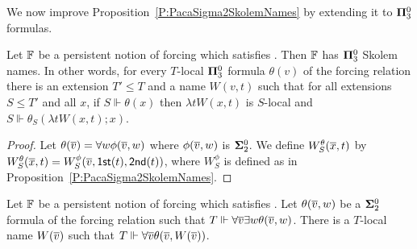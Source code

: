 We now improve Proposition~\ref{P:PacaSigma2SkolemNames}
by extending it to $\mathbf{\Pi}^0_3$ formulas.

\begin{prop}[\ACAo]\label{P:PacaPi3SkolemNames}
Let $\mathbb{F}$ be a persistent notion of forcing which satisfies \MCP.
Then $\mathbb{F}$ has $\mathbf{\Pi}^0_3$ Skolem names.
In other words, for every $T$-local $\mathbf{\Pi}^0_3$ formula $\theta(v)$ of the
forcing relation there is an extension $T'\leq T$ and a name $W(v,t)$
such that for all extensions $S\leq T'$ and all $x$,
if $S\Vdash\theta(x)$ then $\lambda tW(x,t)$
is $S$-local and $S\Vdash\theta_S(\lambda tW(x,t);x)$.
\end{prop}
\begin{proof}
Let $\theta(\overline{v})=\forall w\phi(\overline{v},w)$ where $\phi(\overline{v},w)$ is $\mathbf{\Sigma}^0_2$.
We define $W^\theta_S(\overline{x},t)$ by
$W^\theta_S(\overline{x},t)=W^\phi_S(\overline{v},\mathsf{1st}(t),\mathsf{2nd}(t))$,
where $W^\phi_S$ is defined as in Proposition~\ref{P:PacaSigma2SkolemNames}.
\end{proof}

\begin{cor}\label{C:Pi2unif}
Let $\mathbb{F}$ be a persistent notion of forcing which satisfies \MCP.
Let $\theta(\overline{v},w)$ be a $\mathbf{\Sigma}^0_2$ formula of the forcing relation
such that $T\Vdash\forall\overline{v}\exists w\theta(\overline{v},w)$.
There is a $T$-local name $W(\overline{v})$ such that
$T\Vdash\forall\overline{v}\theta(\overline{v},W(\overline{v}))$.
\end{cor}
